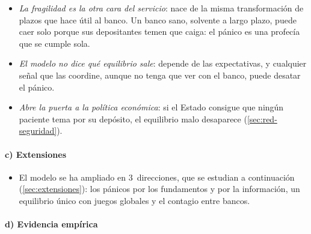 \documentclass[11pt]{article}
\begin{document}
\begin{itemize}
\item \emph{La fragilidad es la otra cara del servicio}: nace de la misma transformación de plazos que hace útil al banco. Un banco sano, solvente a largo plazo, puede caer solo porque sus depositantes temen que caiga: el pánico es una profecía que se cumple sola.
\item \emph{El modelo no dice qué equilibrio sale}: depende de las expectativas, y cualquier señal que las coordine, aunque no tenga que ver con el banco, puede desatar el pánico.
\item \emph{Abre la puerta a la política económica}: si el Estado consigue que ningún paciente tema por su depósito, el equilibrio malo desaparece (\ref{sec:red-seguridad}).
\end{itemize}

\paragraph{c) Extensiones}

\begin{itemize}
\item El modelo se ha ampliado en 3~direcciones, que se estudian a continuación (\ref{sec:extensiones}): los pánicos por los fundamentos y por la información, un equilibrio único con juegos globales y el contagio entre bancos.
\end{itemize}

\paragraph{d) Evidencia empírica}
\end{document}
